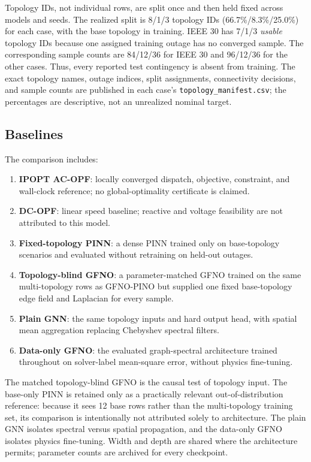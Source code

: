 \documentclass[final,5p,times,twocolumn]{elsarticle}
\begin{document}
Topology IDs, not individual rows, are split once and then held fixed across
models and seeds. The realized split is 8/1/3 topology IDs
(66.7\%/8.3\%/25.0\%) for each case, with the base topology in training.
IEEE 30 has 7/1/3 \emph{usable} topology IDs because one assigned training
outage has no converged sample. The corresponding sample counts are
84/12/36 for IEEE 30 and 96/12/36 for the other cases. Thus, every reported
test contingency is absent from training. The exact topology names, outage
indices, split assignments, connectivity decisions, and sample counts are
published in each case's \texttt{topology\_manifest.csv}; the percentages are
descriptive, not an unrealized nominal target.

\subsection{Baselines}

The comparison includes:
\begin{enumerate}
  \item \textbf{IPOPT AC-OPF}: locally converged dispatch, objective,
    constraint, and wall-clock reference; no global-optimality certificate is
    claimed.
  \item \textbf{DC-OPF}: linear speed baseline; reactive and voltage feasibility
    are not attributed to this model.
  \item \textbf{Fixed-topology PINN}: a dense PINN trained only on base-topology
    scenarios and evaluated without retraining on held-out outages.
  \item \textbf{Topology-blind GFNO}: a parameter-matched GFNO trained on the
    same multi-topology rows as GFNO-PINO but supplied one fixed base-topology
    edge field and Laplacian for every sample.
  \item \textbf{Plain GNN}: the same topology inputs and hard output head, with
    spatial mean aggregation replacing Chebyshev spectral filters.
  \item \textbf{Data-only GFNO}: the evaluated graph-spectral architecture trained
    throughout on solver-label mean-square error, without physics fine-tuning.
\end{enumerate}
The matched topology-blind GFNO is the causal test of topology input. The
base-only PINN is retained only as a practically relevant out-of-distribution
reference: because it sees 12 base rows rather than the multi-topology training
set, its comparison is intentionally not attributed solely to architecture.
The plain GNN isolates spectral versus spatial propagation, and the data-only
GFNO isolates physics fine-tuning. Width and depth are shared where the
architecture permits; parameter counts are archived for every checkpoint.
\end{document}
